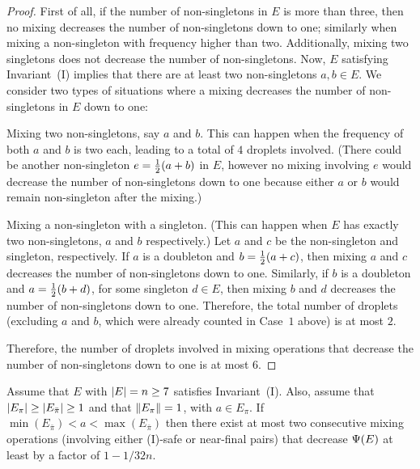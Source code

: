 \begin{proof}
	First of all, if the number of non-singletons in $E$ is more than three, 
	then no mixing decreases the number of non-singletons down to one;
	similarly when mixing a non-singleton with frequency higher than two.
	Additionally, mixing two singletons does not decrease the number of non-singletons.	
	Now, $E$ satisfying Invariant~(I) implies that there are 
	at least two non-singletons $a,b\in E$.	
	We consider two types of situations where a mixing decreases the number 
	of non-singletons in $E$ down to one:
	
	\medskip\noindent{} Mixing two non-singletons, say $a$ and $b$.
	This can happen when the frequency of both $a$ and $b$ is two each,
	leading to a total of $4$ droplets involved.
	(There could be another non-singleton $e={\textstyle\frac{1}{2}}(a+b)$ in $E$, however no mixing 
	involving $e$ would decrease the number of non-singletons down to one
	because either $a$ or $b$ would remain non-singleton after the mixing.)	
	
	\medskip\noindent{} Mixing a non-singleton with a singleton.
	(This can happen when $E$ has exactly two non-singletons, $a$ and $b$ respectively.)
	Let $a$ and $c$ be the non-singleton and singleton, respectively.	
	If $a$ is a doubleton and $b={\textstyle\frac{1}{2}}(a+c)$, then mixing $a$ and $c$ decreases
	the number of non-singletons down to one.
	Similarly, if $b$ is a doubleton and $a={\textstyle\frac{1}{2}}(b+d)$, for some singleton $d\in E$,
	then mixing $b$ and $d$ decreases the number of non-singletons down to one.
	Therefore, the total number of droplets (excluding $a$ and $b$, which were already
	counted in Case~$1$ above) is at most $2$.
	
	\medskip
	Therefore, the number of droplets involved in mixing operations that decrease 
	the number of non-singletons down to one is at most $6$.
\end{proof}


\begin{lemma}\label{lem: farm mix in E odd overlapping E even}
	Assume that $E$ with ${|E|}=n\geq 7$ satisfies Invariant~(I).
	Also, assume that ${|E_{\pi}|}\geq{|E_{\bar{\pi}}|}\geq 1$ and
	that ${\|E_{\pi}\|} = 1$, with $a\in E_{\pi}$.
	If $\min(E_{\bar{\pi}})<a<\max(E_{\bar{\pi}})$ then there exist at most
	two consecutive mixing operations (involving either (I)-safe or near-final pairs) that
	decrease ${\Psi}(E)$ at least by a factor of $1-1/32n$.
\end{lemma}   

